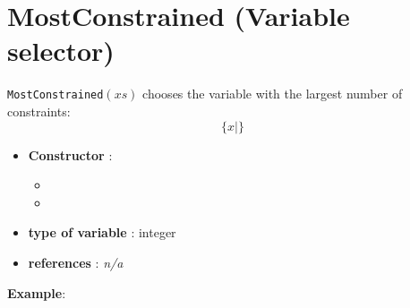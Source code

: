 \section{MostConstrained (Variable selector)}\label{mostconstrained:mostconstrainedvarselector}\hypertarget{mostconstrained:mostconstrainedvarselector}{}
\begin{notedef}
  \texttt{MostConstrained}$(xs)$ chooses the variable with the largest number of constraints:
$$\{x | \}$$
\end{notedef}

\begin{itemize}
	\item \textbf{Constructor} : 
	\begin{itemize}
	\item {}
	\item {}
	\end{itemize}	
	\item \textbf{type of variable} : integer
	\item \textbf{references} : \emph{n/a}
\end{itemize}

\textbf{Example}:
%

